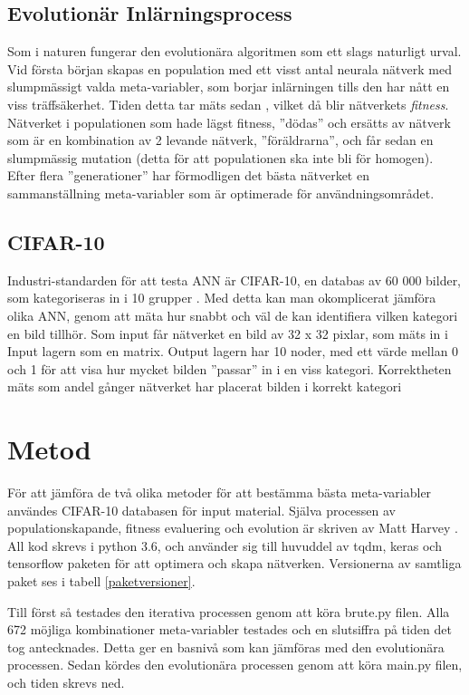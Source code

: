 \documentclass[a4paper, 11pt, twocolumn]{article}
\begin{document}
    \subsection{Evolutionär Inlärningsprocess}
    Som i naturen fungerar den evolutionära algoritmen som ett slags naturligt urval. Vid första början skapas en population med ett visst antal neurala nätverk med slumpmässigt valda meta-variabler, som borjar inlärningen tills den har nått en viss träffsäkerhet. Tiden detta tar mäts sedan , vilket då blir nätverkets \textit{fitness}. Nätverket i populationen som hade lägst fitness, ”dödas” och ersätts av nätverk som är en kombination av 2 levande nätverk, ”föräldrarna”, och får sedan en slumpmässig mutation (detta för att populationen ska inte bli för homogen). Efter flera ”generationer” har förmodligen det bästa nätverket en sammanställning meta-variabler som är optimerade för användningsområdet. \parencite{yao1997new}

    \subsection{CIFAR-10}
    Industri-standarden för att testa ANN är CIFAR-10, en databas av 60 000 bilder, som kategoriseras in i 10 grupper \parencite{krizhevsky2014cifar}. Med detta kan man okomplicerat jämföra olika ANN, genom att mäta hur snabbt och väl de kan identifiera vilken kategori en bild tillhör. Som input får nätverket en bild av 32 x 32 pixlar, som mäts in i Input lagern som en matrix. Output lagern har 10 noder, med ett värde mellan 0 och 1 för att visa hur mycket bilden ”passar” in i en viss kategori. Korrektheten mäts som andel gånger nätverket har placerat bilden i korrekt kategori

  \section{Metod}
  För att jämföra de två olika metoder för att bestämma bästa meta-variabler användes CIFAR-10 databasen för input material. Själva processen av populationskapande, fitness evaluering och evolution är skriven av Matt Harvey \parencite{harvey2017}. All kod skrevs i python 3.6, och använder sig till huvuddel av tqdm, keras och tensorflow paketen för att optimera och skapa nätverken. Versionerna av samtliga paket ses i tabell \ref{paketversioner}.

  Till först så testades den iterativa processen genom att köra brute.py filen. Alla 672 möjliga kombinationer meta-variabler testades och en slutsiffra på tiden det tog antecknades. Detta ger en basnivå som kan jämföras med den evolutionära processen. Sedan kördes den evolutionära processen genom att köra main.py filen, och tiden skrevs ned.
\end{document}
